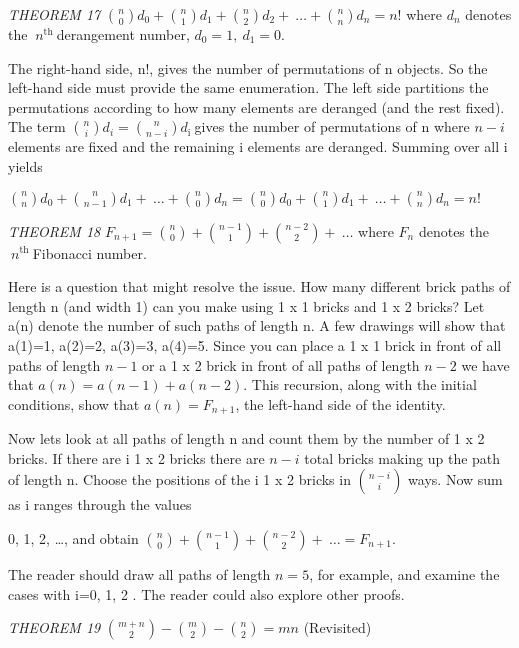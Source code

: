 \emph{THEOREM 17} \(\binom{n}{0}
d_{0} +
\binom{n}{1}
d_{1} +
\binom{n}{2}
d_{2} + \ \ldots +
\binom{n}{n}
d_{n} = n!\) where \(d_{n}\) denotes the
\(\ n^{\text{th}}\ \)derangement number, \(d_{0} = 1,\ d_{1} = 0.\)

The right-hand side, n!, gives the number of permutations of n objects.
So the left-hand side must provide the same enumeration. The left side
partitions the permutations according to how many elements are deranged
(and the rest fixed). The term \(\binom{n}{i}
d_{i} =
\binom{n}{n - i}
d_{\text{i\ }}\)gives the number of permutations of n where
\(n - i\) elements are fixed and the remaining i elements are deranged.
Summing over all i yields

\(\binom{n}{n}
d_{0} +
\binom{n}{n - 1}
d_{1} + \ \ldots +
\binom{n}{0}
d_{n} =
\binom{n}{0}
d_{0} +
\binom{n}{1}
d_{1} + \ \ldots +
\binom{n}{n}
d_{n} = n!\)

\emph{THEOREM 18} \(F_{n + 1} =
\binom{n}{0}
 +
\binom{n - 1}{1}
 +
\binom{n - 2}{2}
 + \ \ldots\) where \(F_{n}\) denotes the
\(\ n^{\text{th}}\ \)Fibonacci number.

Here is a question that might resolve the issue. How many different
brick paths of length n (and width 1) can you make using 1 x 1 bricks
and 1 x 2 bricks? Let a(n) denote the number of such paths of length n.
A few drawings will show that a(1)=1, a(2)=2, a(3)=3, a(4)=5. Since you
can place a 1 x 1 brick in front of all paths of length \(n - 1\) or a 1
x 2 brick in front of all paths of length \(n - 2\) we have that
\(a\left( n \right) = a\left( n - 1 \right) + a\left( n - 2 \right)\).
This recursion, along with the initial conditions, show that
\(a\left( n \right) = F_{n + 1}\), the left-hand side of the identity.

Now lets look at all paths of length n and count them by the number of 1
x 2 bricks. If there are i 1 x 2 bricks there are \(n - i\) total bricks
making up the path of length n. Choose the positions of the i 1 x 2
bricks in \(\binom{n - i}{i}
\) ways. Now sum as i ranges through the values

0, 1, 2, \ldots{}, and obtain \(\binom{n}{0}
 +
\binom{n - 1}{1}
 +
\binom{n - 2}{2}
 + \ \ldots = F_{n + 1}\).

The reader should draw all paths of length \(n = 5\), for example, and
examine the cases with i=0, 1, 2 . The reader could also explore other
proofs.

\emph{THEOREM 19} \(\binom{m + n}{2}
 -
\binom{m}{2}
 -
\binom{n}{2}
 = mn\) (Revisited)

